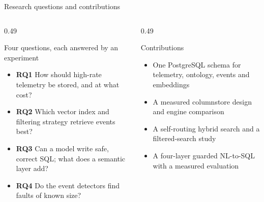\documentclass[aspectratio=169,10pt]{beamer}
\begin{document}
\begin{frame}[shrink=5]{Research questions and contributions}
\begin{columns}[T]
\begin{column}{0.49\textwidth}
\begin{block}{Four questions, each answered by an experiment}
\begin{itemize}
  \item \textbf{RQ1} How should high-rate telemetry be stored, and at what cost?
  \item \textbf{RQ2} Which vector index and filtering strategy retrieve events best?
  \item \textbf{RQ3} Can a model write safe, correct SQL; what does a semantic layer add?
  \item \textbf{RQ4} Do the event detectors find faults of known size?
\end{itemize}
\end{block}
\end{column}
\begin{column}{0.49\textwidth}
\begin{block}{Contributions}
\begin{itemize}
  \item One PostgreSQL schema for telemetry, ontology, events and embeddings
  \item A measured columnstore design and engine comparison
  \item A self-routing hybrid search and a filtered-search study
  \item A four-layer guarded NL-to-SQL with a measured evaluation
\end{itemize}
\end{block}
\end{column}
\end{columns}
\end{frame}
\end{document}
